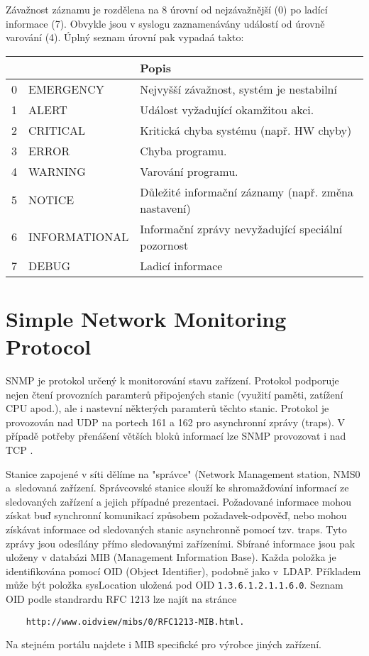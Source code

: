 Závažnost záznamu je rozdělena na 8 úrovní od nejzávažnější (0) po ladící informace (7). Obvykle
 jsou v syslogu zaznamenávány událostí od úrovně varování (4). Úplný seznam úrovní pak vypadaá takto:
\begin{table}[!h]
	\centering
	\begin{tabular}[!h]{|c|l|l|}
	\hline
	\shortstack{Závažnost} & & Popis \\
	\hline
	0 & EMERGENCY & Nejvyšší závažnost, systém je nestabilní\\
	1 & ALERT & Událost vyžadující okamžitou akci.\\
	2 & CRITICAL & Kritická chyba systému (např. HW chyby) \\
	3 & ERROR & Chyba programu.\\
	4 & WARNING & Varování programu.\\
	5 & NOTICE & Důležité informační záznamy (např. změna nastavení)\\
	6 & INFORMATIONAL & Informační zprávy nevyžadující speciální pozornost\\
	7 & DEBUG & Ladicí informace\\
	\hline
	\end{tabular}
\end{table}

\section{Simple Network Monitoring Protocol}
SNMP \cite{rfc1157} je protokol určený k monitorování stavu zařízení. Protokol podporuje nejen čtení
 provozních paramterů připojených stanic (využití paměti, zatížení CPU apod.), ale i nastevní
 některých paramterů těchto stanic.
Protokol je provozován nad UDP na portech 161 a 162 pro asynchronní zprávy (traps). V případě
 potřeby přenášení větších bloků informací lze SNMP provozovat i nad TCP \cite{rfc3430}.

Stanice zapojené v síti dělíme na "správce" (Network Management station, NMS0 a~sledovaná zařízení.
 Správcovské stanice slouží ke shromažďování informací ze sledovaných zařízení a jejich případné prezentaci.
Požadované informace mohou získat buď synchronní komunikací způsobem požadavek-odpověď, nebo mohou
 získávat informace od sledovaných stanic asynchronně pomocí tzv. traps. Tyto zprávy jsou odesílány
 přímo sledovanými zařízeními. Sbírané informace jsou pak uloženy v databázi MIB
 (Management Information Base). Každa položka je identifikována pomocí OID (Object Identifier),
 podobně jako v~LDAP. Příkladem může být položka sysLocation uložená pod OID {\tt 1.3.6.1.2.1.1.6.0}.
 Seznam OID podle standrardu RFC 1213\cite{rfc1213} lze najít na stránce
\begin{verbatim}
    http://www.oidview/mibs/0/RFC1213-MIB.html.
\end{verbatim}
Na stejném portálu najdete i MIB specifické pro výrobce jiných zařízení.

